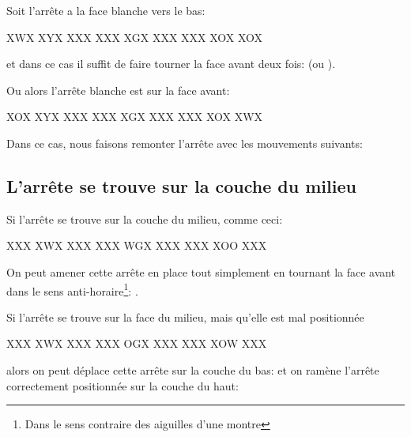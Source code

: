 Soit l'arrête a la face blanche vers le bas:

\begin{center}
	\RubikFaceDown%
	{X}{W}{X}%
	{X}{Y}{X}%
	{X}{X}{X}
	\RubikFaceRight%
	{X}{X}{X}%
	{X}{G}{X}%
	{X}{X}{X}
	\RubikFaceFront%
	{X}{X}{X}%
	{X}{O}{X}%
	{X}{O}{X}
\end{center}

et dans ce cas il suffit de faire tourner la face avant deux fois:  (ou ).

Ou alors l'arrête blanche est sur la face avant:

\begin{center}
	\RubikFaceDown%
	{X}{O}{X}%
	{X}{Y}{X}%
	{X}{X}{X}
	\RubikFaceRight%
	{X}{X}{X}%
	{X}{G}{X}%
	{X}{X}{X}
	\RubikFaceFront%
	{X}{X}{X}%
	{X}{O}{X}%
	{X}{W}{X}
\end{center}

Dans ce cas, nous faisons remonter l'arrête avec les mouvements suivants: 


\subsection{L'arrête se trouve sur la couche du milieu}

Si l'arrête se trouve sur la couche du milieu, comme ceci:

\begin{center}
	\RubikFaceUp%
	{X}{X}{X}%
	{X}{W}{X}%
	{X}{X}{X}
	\RubikFaceRight%
	{X}{X}{X}%
	{W}{G}{X}%
	{X}{X}{X}
	\RubikFaceFront%
	{X}{X}{X}%
	{X}{O}{O}%
	{X}{X}{X}
\end{center}

On peut amener cette arrête en place tout simplement en tournant la face avant dans le sens anti-horaire\footnote{Dans le sens contraire des aiguilles d'une montre}: .

Si l'arrête se trouve sur la face du milieu, mais qu'elle est mal positionnée

\begin{center}
	\RubikFaceUp%
	{X}{X}{X}%
	{X}{W}{X}%
	{X}{X}{X}
	\RubikFaceRight%
	{X}{X}{X}%
	{O}{G}{X}%
	{X}{X}{X}
	\RubikFaceFront%
	{X}{X}{X}%
	{X}{O}{W}%
	{X}{X}{X}
\end{center}

alors on peut déplace cette arrête sur la couche du bas:  et on ramène l'arrête correctement positionnée sur la couche du haut: 


